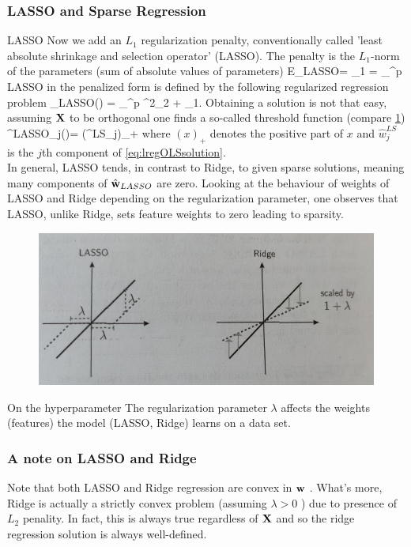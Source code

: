 \subsubsection{LASSO and Sparse Regression}
\begin{mybox}{LASSO}
	Now we add an $L_1$ regularization penalty, conventionally called ’least absolute shrinkage and selection operator’ (LASSO). The penalty is the $L_1$-norm of the parameters (sum of absolute values of parameters)
	\be 
	E_{LASSO}= \lambda \norm{\mw}_1 = \lambda \sum_{}^p \abs{\mw_\gamma}
	\ee 
	LASSO in the penalized form is defined by the following regularized regression problem
	\be 
	\label{eq:lregLASSO}
	\hat{\mw}_{LASSO}(\lambda) = \arg \min_{\mw \in \mR^p} \norm{\mX \mw - \my }^2_2 + \lambda \norm{\mw}_1.
	\ee 
	Obtaining a solution is not that easy, assuming $\mathbf{X}$ to be orthogonal one finds a so-called threshold function (compare \ref{fig:lassovsridge})
	\be 
	\label{eq:lregLASSOSol}
	^{LASSO}_j(\lambda)= (^{LS}_j)_+
	\ee 
	where $(x)_+$ denotes the positive part of $x$ and $\hat{w}^{LS}_j$ is the $j$th component of \ref{eq:lregOLSsolution}.\\
	In general, LASSO tends, in contrast to Ridge, to given sparse solutions, meaning many components of $\hat{\mathbf{w}}_{LASSO}$ are zero. Looking at the behaviour of weights of LASSO and Ridge depending on the regularization parameter, one observes that LASSO, unlike Ridge, sets feature weights to zero leading to sparsity.
\end{mybox}
\begin{figure}[h!]
	\centering
	\includegraphics[width=0.7\linewidth]{gfx/LassoVsRidge}
	\caption{}
	\label{fig:lassovsridge}
\end{figure}
\begin{mybox}{On the hyperparameter}
	The regularization parameter $\lambda$ affects the weights (features) the model (LASSO, Ridge) learns on a data set.
\end{mybox}

\subsubsection{A note on LASSO and Ridge}
Note that both LASSO and Ridge regression are convex in  $\mathbf{w}$ . What's more, Ridge is actually a strictly convex problem (assuming  $\lambda >0$ ) due to presence of $L_2$ penality. In fact, this is always true regardless of  $\mathbf{X}$  and so the ridge regression solution is always well-defined.

